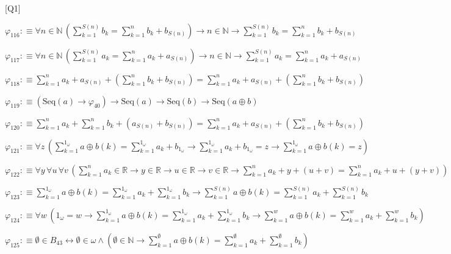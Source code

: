 \begin{fullproof}{[Q1]}
\begin{abbrevlist}
\item $\varphi_{116} :\equiv \forall n \in \mathbb{N}\,({\textstyle\sum_{k=1}^{S(n)} b_{k}} = {\textstyle\sum_{k=1}^{n} b_{k}} + b_{S(n)}) \to n \in \mathbb{N} \to {\textstyle\sum_{k=1}^{S(n)} b_{k}} = {\textstyle\sum_{k=1}^{n} b_{k}} + b_{S(n)}$
\item $\varphi_{117} :\equiv \forall n \in \mathbb{N}\,({\textstyle\sum_{k=1}^{S(n)} a_{k}} = {\textstyle\sum_{k=1}^{n} a_{k}} + a_{S(n)}) \to n \in \mathbb{N} \to {\textstyle\sum_{k=1}^{S(n)} a_{k}} = {\textstyle\sum_{k=1}^{n} a_{k}} + a_{S(n)}$
\item $\varphi_{118} :\equiv {\textstyle\sum_{k=1}^{n} a_{k}} + a_{S(n)} + ({\textstyle\sum_{k=1}^{n} b_{k}} + b_{S(n)}) = {\textstyle\sum_{k=1}^{n} a_{k}} + a_{S(n)} + ({\textstyle\sum_{k=1}^{n} b_{k}} + b_{S(n)})$
\item $\varphi_{119} :\equiv (\mathrm{Seq}(a) \to \varphi_{40}) \to \mathrm{Seq}(a) \to \mathrm{Seq}(b) \to \mathrm{Seq}(a \oplus b)$
\item $\varphi_{120} :\equiv {\textstyle\sum_{k=1}^{n} a_{k}} + {\textstyle\sum_{k=1}^{n} b_{k}} + (a_{S(n)} + b_{S(n)}) = {\textstyle\sum_{k=1}^{n} a_{k}} + a_{S(n)} + ({\textstyle\sum_{k=1}^{n} b_{k}} + b_{S(n)})$
\item $\varphi_{121} :\equiv \forall z\,({\textstyle\sum_{k=1}^{1_{\omega}} a \oplus b(k)} = {\textstyle\sum_{k=1}^{1_{\omega}} a_{k}} + b_{1_{\omega}} \to {\textstyle\sum_{k=1}^{1_{\omega}} a_{k}} + b_{1_{\omega}} = z \to {\textstyle\sum_{k=1}^{1_{\omega}} a \oplus b(k)} = z)$
\item $\varphi_{122} :\equiv \forall y\,\forall u\,\forall v\,({\textstyle\sum_{k=1}^{n} a_{k}} \in \mathbb{R} \to y \in \mathbb{R} \to u \in \mathbb{R} \to v \in \mathbb{R} \to {\textstyle\sum_{k=1}^{n} a_{k}} + y + (u + v) = {\textstyle\sum_{k=1}^{n} a_{k}} + u + (y + v))$
\item $\varphi_{123} :\equiv {\textstyle\sum_{k=1}^{1_{\omega}} a \oplus b(k)} = {\textstyle\sum_{k=1}^{1_{\omega}} a_{k}} + {\textstyle\sum_{k=1}^{1_{\omega}} b_{k}} \to {\textstyle\sum_{k=1}^{S(n)} a \oplus b(k)} = {\textstyle\sum_{k=1}^{S(n)} a_{k}} + {\textstyle\sum_{k=1}^{S(n)} b_{k}}$
\item $\varphi_{124} :\equiv \forall w\,(1_{\omega} = w \to {\textstyle\sum_{k=1}^{1_{\omega}} a \oplus b(k)} = {\textstyle\sum_{k=1}^{1_{\omega}} a_{k}} + {\textstyle\sum_{k=1}^{1_{\omega}} b_{k}} \to {\textstyle\sum_{k=1}^{w} a \oplus b(k)} = {\textstyle\sum_{k=1}^{w} a_{k}} + {\textstyle\sum_{k=1}^{w} b_{k}})$
\item $\varphi_{125} :\equiv \emptyset \in B_{43} \leftrightarrow \emptyset \in \omega \land (\emptyset \in \mathbb{N} \to {\textstyle\sum_{k=1}^{\emptyset} a \oplus b(k)} = {\textstyle\sum_{k=1}^{\emptyset} a_{k}} + {\textstyle\sum_{k=1}^{\emptyset} b_{k}})$

\end{abbrevlist}
\end{fullproof}
